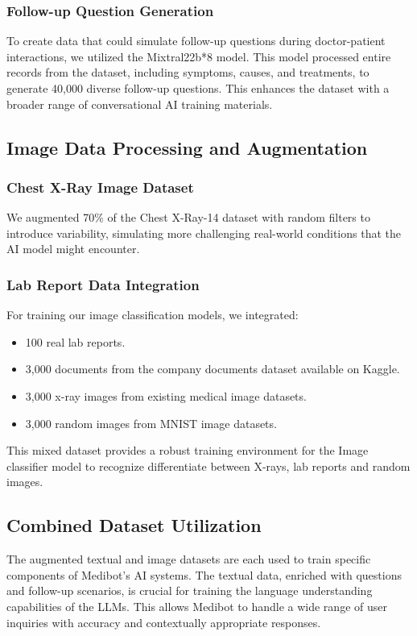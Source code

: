 \subsubsection{Follow-up Question Generation}
To create data that could simulate follow-up questions during doctor-patient interactions, we utilized the Mixtral22b*8 model. This model processed entire records from the dataset, including symptoms, causes, and treatments, to generate 40,000 diverse follow-up questions. This enhances the dataset with a broader range of conversational AI training materials.

\subsection{Image Data Processing and Augmentation}
\subsubsection{Chest X-Ray Image Dataset}
We augmented 70\% of the Chest X-Ray-14 dataset with random filters to introduce variability, simulating more challenging real-world conditions that the AI model might encounter.

\subsubsection{Lab Report Data Integration}
For training our image classification models, we integrated:
\begin{itemize}
    \item 100 real lab reports.
    \item 3,000 documents from the company documents dataset available on Kaggle.
    \item 3,000 x-ray images from existing medical image datasets.
    \item 3,000 random images from MNIST image datasets.

\end{itemize}
This mixed dataset provides a robust training environment for the Image classifier model to recognize differentiate between X-rays, lab reports and random images.

\subsection{Combined Dataset Utilization}
The augmented textual and image datasets are each used to train specific components of Medibot's AI systems. The textual data, enriched with questions and follow-up scenarios, is crucial for training the language understanding capabilities of the LLMs. This allows Medibot to handle a wide range of user inquiries with accuracy and contextually appropriate responses.

